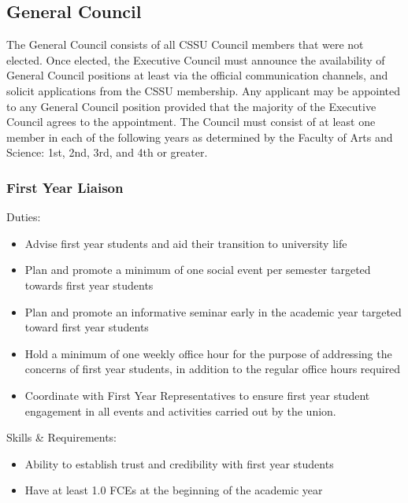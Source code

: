\documentclass{article}
\begin{document}
\subsection{General Council} \label{sec:2.3}
The General Council consists of all CSSU Council members that were not elected. Once
elected, the Executive Council must announce the availability of General Council positions at
least via the official communication channels, and solicit applications from the CSSU
membership. Any applicant may be appointed to any General Council position provided that the
majority of the Executive Council agrees to the appointment.
The Council must consist of at least one member in each of the following years as determined
by the Faculty of Arts and Science: 1st, 2nd, 3rd, and 4th or greater.
\subsubsection{First Year Liaison} \label{sec:2.3.1}
Duties:
\begin{itemize}
    \item Advise first year students and aid their transition to university life
    \item Plan and promote a minimum of one social event per semester targeted towards first
year students
    \item Plan and promote an informative seminar early in the academic year targeted toward
first year students
    \item Hold a minimum of one weekly office hour for the purpose of addressing the concerns of
first year students, in addition to the regular office hours required
    \item Coordinate with First Year Representatives to ensure first year student engagement in
all events and activities carried out by the union.
\end{itemize}
Skills & Requirements:
\begin{itemize}
    \item Ability to establish trust and credibility with first year students
    \item Have at least 1.0 FCEs at the beginning of the academic year
\end{itemize}
\end{document}
